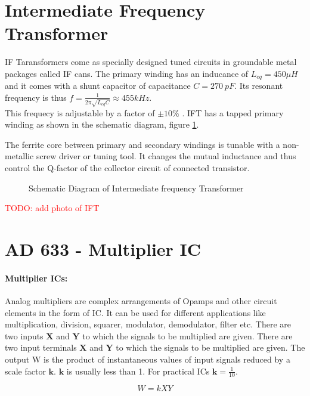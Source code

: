 \section{Intermediate Frequency Transformer}
\label{IFT}
IF Taransformers come as specially designed tuned circuits in groundable metal packages called IF cans. The primary winding has an inducance of $L_{eq}=450\mu H$ and it comes with a shunt capacitor of capacitance $C=270\ pF$. Its resonant frequency is thus $f=\frac{1}{2\pi\sqrt{L_{eq}C}}\approx 455 kHz$.\\ This frequecy is adjustable by a factor of $\pm 10 \%$ . IFT has a tapped primary winding as shown in the schematic diagram, figure \ref{iftschem}. 

The ferrite core between primary and secondary windings is tunable with a non-metallic screw driver or tuning tool. It changes the mutual inductance and thus control the Q-factor of the collector circuit of connected transistor\cite{Tomasi}.
 
\begin{figure}
\caption {Schematic Diagram of Intermediate frequency Transformer}
\label{iftschem}
\end{figure}

\textcolor{red}{TODO: add photo of IFT}


\section{AD 633 - Multiplier IC}
\label{AD633}
\paragraph{Multiplier ICs:}
 Analog multipliers are complex arrangements of Opamps and other circuit elements in the form of IC. It can be used for different applications like multiplication, division, squarer, modulator, demodulator, filter etc. There are two inputs $\textbf{X}$ and $\textbf{Y}$ to which the signals to be multiplied are given.
There are two input terminals $\textbf{X}$ and $\textbf{Y}$ to which the signals to be multiplied are given. The output W is the product of instantaneous values of input signals reduced by a scale factor $\textbf{k}$. $\textbf{k}$ is usually less than 1. For practical ICs $\textbf{k}=\frac{1}{10}$.

\begin{equation}
W=kXY
\end{equation}

